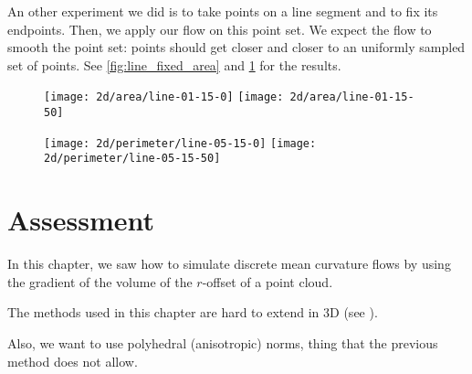 
An other experiment we did is to take points on a line segment and to fix its
endpoints. Then, we apply our flow on this point set. We expect the flow to
smooth the point set: points should get closer and closer to an uniformly
sampled set of points. See \ref{fig:line_fixed_area} and
\ref{fig:line_fixed_perimeter} for the results.

\begin{figure}[h]
    \centering

    \texttt{[image: 2d/area/line-01-15-0]}
    \texttt{[image: 2d/area/line-01-15-50]}
    \label{fig:line_fixed_area}

    \texttt{[image: 2d/perimeter/line-05-15-0]}
    \texttt{[image: 2d/perimeter/line-05-15-50]}
    \label{fig:line_fixed_perimeter}
\end{figure}


\section{Assessment}

In this chapter, we saw how to simulate discrete mean curvature flows by using
the gradient of the volume of the $r$-offset of a point cloud.

The methods used in this chapter are hard to extend in 3D (see
\cite{cazals2011computing}).

Also, we want to use polyhedral (anisotropic) norms, thing that the previous
method does not allow.


